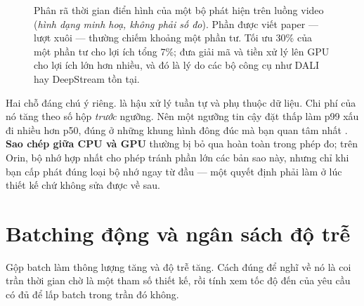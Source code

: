 \documentclass[../../deep_learning.tex]{subfiles}
\begin{document}
\begin{figure}[H]\centering
{}
\caption{Phân rã thời gian điển hình của một bộ phát hiện trên luồng video (\emph{hình dạng minh hoạ, không phải số đo}). Phần được viết paper --- lượt xuôi --- thường chiếm khoảng một phần tư. Tối ưu 30\% của một phần tư cho lợi ích tổng 7\%; đưa giải mã và tiền xử lý lên GPU cho lợi ích lớn hơn nhiều, và đó là lý do các bộ công cụ như DALI hay DeepStream tồn tại.}
\label{fig:phan-ra-thoi-gian}
\end{figure}

Hai chỗ đáng chú ý riêng. \textbf{} là hậu xử lý tuần tự và phụ thuộc dữ liệu. Chi phí của nó tăng theo số hộp \emph{trước} ngưỡng. Nên một ngưỡng tin cậy đặt thấp làm p99 xấu đi nhiều hơn p50, đúng ở những khung hình đông đúc mà bạn quan tâm nhất \cite{bodla2017softnms}. \textbf{Sao chép giữa CPU và GPU} thường bị bỏ qua hoàn toàn trong phép đo; trên Orin, bộ nhớ hợp nhất cho phép tránh phần lớn các bản sao này, nhưng chỉ khi bạn cấp phát đúng loại bộ nhớ ngay từ đầu --- một quyết định phải làm ở lúc thiết kế chứ không sửa được về sau.


\section{Batching động và ngân sách độ trễ}
Gộp batch làm thông lượng tăng và độ trễ tăng. Cách đúng để nghĩ về nó là coi trần thời gian chờ là một tham số thiết kế, rồi tính xem tốc độ đến của yêu cầu có đủ để lấp batch trong trần đó không.
\end{document}
